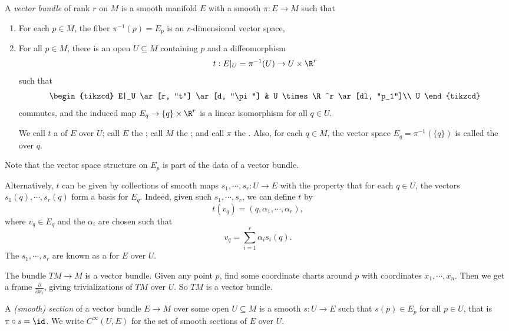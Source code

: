 \documentclass[a4paper]{article}
\begin{document}
\begin{defi}
  A \emph{vector bundle} of rank $r$ on $M$ is a smooth manifold $E$ with a smooth $\pi: E \to M$ such that
  \begin{enumerate}
    \item For each $p \in M$, the fiber $\pi^{-1}(p) = E_p$ is an $r$-dimensional vector space,
    \item For all $p \in M$, there is an open $U \subseteq M$ containing $p$ and a diffeomorphism
      \[
        t: E|_U = \pi^{-1}(U) \to U \times \R^r
      \]
      such that
      \[
        \begin{tikzcd}
          E|_U \ar[r, "t"] \ar[d, "\pi"] & U \times \R^r \ar[dl, "p_1"]\\
          U
        \end{tikzcd}
      \]
      commutes, and the induced map $E_q \to \{q\} \times \R^r$ is a linear isomorphism for all $q \in U$.

      We call $t$ a  of $E$ over $U$; call $E$ the ; call $M$ the ; and call $\pi$ the . Also, for each $q \in M$, the vector space $E_q = \pi^{-1}(\{q\})$ is called the  over $q$.
  \end{enumerate}
  Note that the vector space structure on $E_p$ is part of the data of a vector bundle.
\end{defi}

Alternatively, $t$ can be given by collections of smooth maps $s_1, \cdots, s_r: U \to E$ with the property that for each $q \in U$, the vectors $s_1(q), \cdots, s_r(q)$ form a basis for $E_q$. Indeed, given such $s_1, \cdots, s_r$, we can define $t$ by
\[
  t(v_q) = (q, \alpha_1, \cdots, \alpha_r),
\]
where $v_q \in E_q$ and the $\alpha_i$ are chosen such that
\[
  v_q = \sum_{i = 1}^r \alpha_i s_i(q).
\]
The $s_1, \cdots, s_r$ are known as a  for $E$ over $U$.

\begin{eg}
  The bundle $TM \to M$ is a vector bundle. Given any point $p$, find some coordinate charts around $p$ with coordinates $x_1, \cdots, x_n$. Then we get a frame $\frac{\partial}{\partial x_i}$, giving trivializations of $TM$ over $U$. So $TM$ is a vector bundle.
\end{eg}

\begin{defi}[Section]
  A \emph{(smooth) section} of a vector bundle $E \to M$ over some open $U \subseteq M$ is a smooth $s: U \to E$ such that $s(p) \in E_p$ for all $p \in U$, that is $\pi \circ s = \id$. We write $C^\infty(U, E)$ for the set of smooth sections of $E$ over $U$.
\end{defi}
\end{document}
